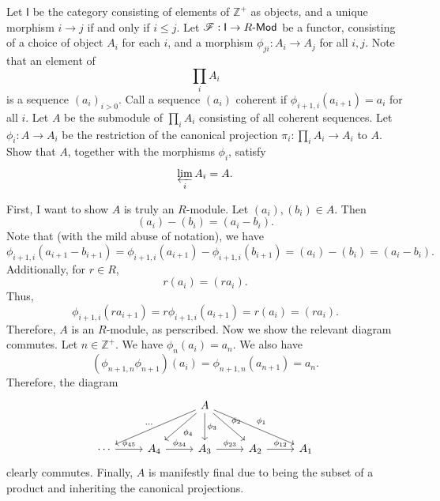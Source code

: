 \documentclass[11pt]{report}
\begin{document}
\begin{exercise}
	Let $\mathsf{I} $ be the category consisting of elements of $\mathbb{Z}^+$ as objects, and a unique morphism $i\to j$ if and only if $i\leq j$. Let $\mathscr{F} : \mathsf{I}  \to R\text{-}\mathsf{Mod} $ be a functor, consisting of a choice of object $A_i$ for each $i$, and a morphism $\phi_{ji} : A_i \to A_j$ for all $i,j$. Note that an element of
	\[
		\prod_{i} A_i
	\]
	is a sequence $(a_i)_{i>0} $. Call a sequence $(a_i)$ coherent if $\phi_{i+1,i} (a_{i+1} )=a_i$ for all $i$. Let $A$ be the submodule of $\prod_{i} A_i$ consisting of all coherent sequences. Let $\phi_i : A \to A_i$ be the restriction of the canonical projection $\pi_i : \prod_{i} A_i \to A_i$ to $A$. Show that $A$, together with the morphisms $\phi_i$, satisfy
	\[
		\varprojlim_i A_i=A
	.\]
\end{exercise}
\begin{solution}
	First, I want to show $A$ is truly an $R$-module. Let $(a_i),(b_i)\in A$. Then
	\[
		(a_i)-(b_i)=(a_i-b_i)
	.\]
	Note that (with the mild abuse of notation), we have
	\[
		\phi_{i+1,i} (a_{i+1} -b_{i+1}) =\phi_{i+1,i}(a_{i+1})-\phi_{i+1,i}(b_{i+1} )=(a_i)-(b_i)=(a_i-b_i)
	.\]
	Additionally, for $r\in R$,
	\[
		r(a_i)=(ra_i)
	.\]
	Thus,
	\[
		\phi_{i+1,i} (ra_{i+1} )=r\phi_{i+1,i} (a_{i+1} )=r(a_i)=(ra_i)
	.\]
	Therefore, $A$ is an $R$-module, as perscribed. Now we show the relevant diagram commutes. Let $n\in\mathbb{Z} ^+$. We have $\phi_n(a_i)=a_n$. We also have
	\[
		\left( \phi_{n+1,n}\phi_{n+1} \right) (a_i)=\phi_{n+1,n} (a_{n+1} )=a_n
	.\]
	Therefore, the diagram
\[\begin{tikzcd}[row sep = 2.5em, column sep = 2.5em]
	&&A\arrow[dll, "\ldots "']\arrow[dl, "\phi_4"]\arrow[d, "\phi_3"]\arrow[dr, "\phi _2"]\arrow[drr, "\phi _1"]\\
	\cdots \arrow[r, "\phi_{45} "]&A_4\arrow[r, "\phi_{34} "]&A_3\arrow[r, "\phi_{23} "]&A_2\arrow[r, "\phi_{12} "]&A_1
\end{tikzcd}\]
clearly commutes. Finally, $A$ is manifestly final due to being the subset of a product and inheriting the canonical projections.
\end{solution}
\end{document}
